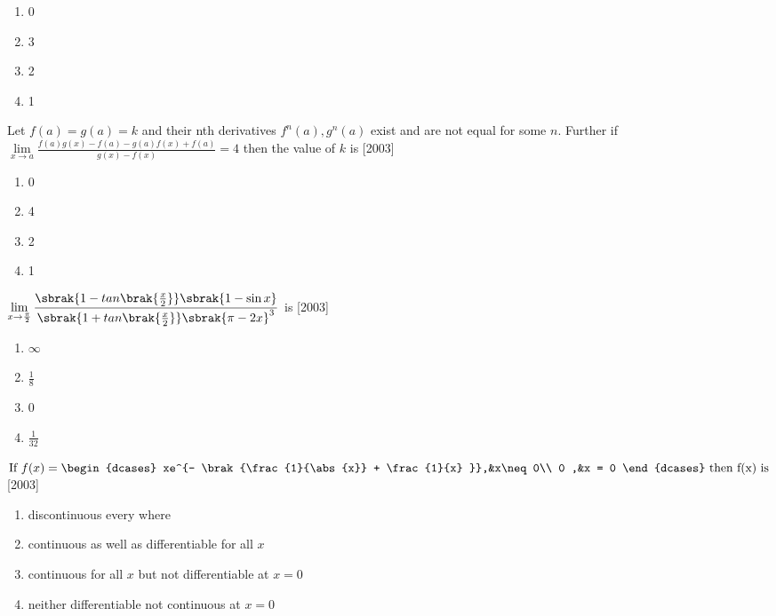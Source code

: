 \begin{enumerate}
    \item{0}
    \item{3}
    \item{2}
    \item{1}\\[2pt]
\end{enumerate}
\item Let $f(a)=g(a)=k$ and their nth derivatives $f^n(a),g^n(a)$ exist and are not equal for some $n$. Further if $\displaystyle \lim\limits_{x\to a}\frac{f(a)g(x)-f(a)-g(a)f(x)+f(a)}{g(x)-f(x)}=4$ then the value of $k$ is \hfill [2003]\\
\begin{enumerate}
    \item{0}
    \item{4}
    \item{2}
    \item{1}\\[2pt]
\end{enumerate}
\item $\displaystyle \lim\limits_{x\to\frac{\pi}{2}}\frac{\sbrak{1-tan\brak{\frac{x}{2}}}\sbrak{1-\sin x}}{ \sbrak{1+tan\brak{\frac{x}{2}}}\sbrak{\pi-2x}^3}$ is \hfill [2003]\\
\begin{enumerate}
    \item{$\infty$}
    \item{$\frac{1}{8}$}
    \item{0}
    \item{$\frac{1}{32}$}\\[2pt]
\end{enumerate}
\item $\displaystyle \text{If } f(x)=
    \begin{dcases}
	    xe^{- \brak{\frac{1}{\abs{x}} + \frac{1}{x} }},&x\neq 0\\ 
        0                                    ,&x = 0
    \end{dcases}
   \text{ then f(x) is}
$ \hfill [2003]\\

\begin{enumerate}
    \item{discontinuous every where}
    \item{continuous as well as differentiable for all $x$}
    \item{continuous for all $x$ but not differentiable at $x=0$}
    \item{neither differentiable not continuous at $x=0$}\\[2pt]

\end{enumerate}

